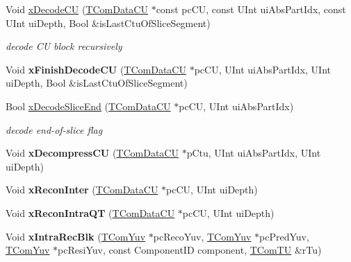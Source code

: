 \begin{DoxyCompactItemize}
Void \hyperlink{class_t_dec_cu_a1b6468a75f24c8ffd5d8028f757afe7d}{x\+Decode\+CU} (\hyperlink{class_t_com_data_c_u}{T\+Com\+Data\+CU} $\ast$const pc\+CU, const U\+Int ui\+Abs\+Part\+Idx, const U\+Int ui\+Depth, Bool \&is\+Last\+Ctu\+Of\+Slice\+Segment)
\begin{DoxyCompactList}\small\item\em decode CU block recursively \end{DoxyCompactList}\item 
\mbox{\label{class_t_dec_cu_a2cc52920765d1bdc8f323840abcb76fc}} 
Void {\bfseries x\+Finish\+Decode\+CU} (\hyperlink{class_t_com_data_c_u}{T\+Com\+Data\+CU} $\ast$pc\+CU, U\+Int ui\+Abs\+Part\+Idx, U\+Int ui\+Depth, Bool \&is\+Last\+Ctu\+Of\+Slice\+Segment)
\item 
\mbox{\label{class_t_dec_cu_af8513ba9af911a74da89a485adb4c284}} 
Bool \hyperlink{class_t_dec_cu_af8513ba9af911a74da89a485adb4c284}{x\+Decode\+Slice\+End} (\hyperlink{class_t_com_data_c_u}{T\+Com\+Data\+CU} $\ast$pc\+CU, U\+Int ui\+Abs\+Part\+Idx)
\begin{DoxyCompactList}\small\item\em decode end-\/of-\/slice flag \end{DoxyCompactList}\item 
\mbox{\label{class_t_dec_cu_a574e45d196437ca2842b73ce5e40d24b}} 
Void {\bfseries x\+Decompress\+CU} (\hyperlink{class_t_com_data_c_u}{T\+Com\+Data\+CU} $\ast$p\+Ctu, U\+Int ui\+Abs\+Part\+Idx, U\+Int ui\+Depth)
\item 
\mbox{\label{class_t_dec_cu_ab0813e0c7bc2d5101a348453e189bfed}} 
Void {\bfseries x\+Recon\+Inter} (\hyperlink{class_t_com_data_c_u}{T\+Com\+Data\+CU} $\ast$pc\+CU, U\+Int ui\+Depth)
\item 
\mbox{\label{class_t_dec_cu_a8e79db710c7df73cd133f9168b8e5399}} 
Void {\bfseries x\+Recon\+Intra\+QT} (\hyperlink{class_t_com_data_c_u}{T\+Com\+Data\+CU} $\ast$pc\+CU, U\+Int ui\+Depth)
\item 
\mbox{\label{class_t_dec_cu_a7b175aafdf27827c3ef836b530c5e17d}} 
Void {\bfseries x\+Intra\+Rec\+Blk} (\hyperlink{class_t_com_yuv}{T\+Com\+Yuv} $\ast$pc\+Reco\+Yuv, \hyperlink{class_t_com_yuv}{T\+Com\+Yuv} $\ast$pc\+Pred\+Yuv, \hyperlink{class_t_com_yuv}{T\+Com\+Yuv} $\ast$pc\+Resi\+Yuv, const Component\+ID component, \hyperlink{class_t_com_t_u}{T\+Com\+TU} \&r\+Tu)

\end{DoxyCompactItemize}
